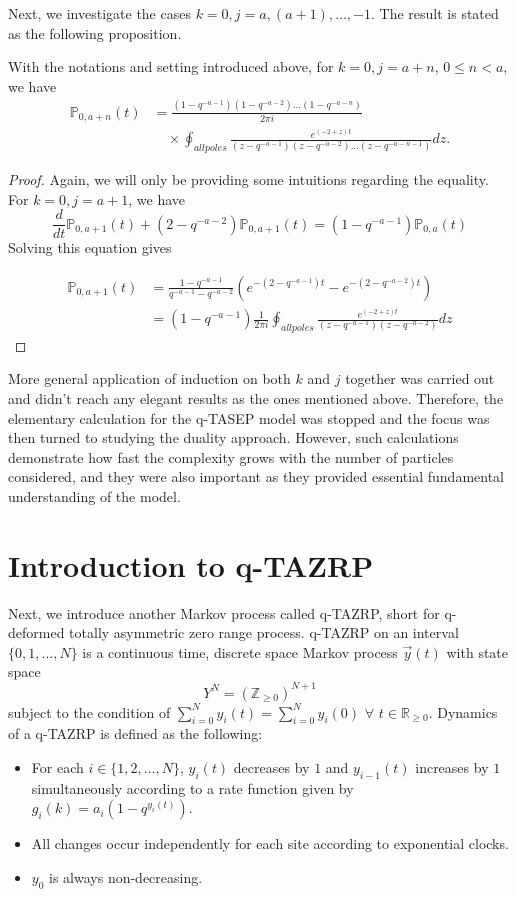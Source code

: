 Next, we investigate the cases $k = 0, j = a, (a+1), \dots, -1$. The result is stated as the following proposition.
\begin{proposition}
With the notations and setting introduced above, for $k = 0, j = a+n$, $0 \le n < a$, we have \\
\begin{align*}
\mathbb{P}_{0,a+n} (t) &= \frac{(1-q^{-a-1})(1-q^{-a-2})...(1-q^{-a-n})}{2 \pi i} \\
& \quad \times \oint_{all poles} \frac{e^{(-2+z)t}}{(z-q^{-a-1})(z-q^{-a-2})...(z-q^{-a-n-1})} dz.
\end{align*}
\end{proposition}

\begin{proof}
Again, we will only be providing some intuitions regarding the equality. \\
For $k=0, j=a+1$, we have $$\frac{d}{dt} \mathbb{P}_{0,a+1}(t) + (2-q^{-a-2}) \mathbb{P}_{0,a+1}(t) = (1-q^{-a-1}) \mathbb{P}_{0,a}(t)$$
 Solving this equation gives 

 \begin{align*}
 \mathbb{P}_{0,a+1} (t) &= \frac{1-q^{-a-1}}{q^{-a-1} - q^{-a-2}} (e^{-(2-q^{-a-1})t} - e^{-(2-q^{-a-2})t})\\
 &= (1-q^{-a-1}) \frac{1}{2 \pi i} \oint_{all poles} \frac{e^{(-2+z)t}}{(z-q^{-a-1})(z-q^{-a-2})} dz
 \end{align*}
\end{proof}

More general application of induction on both $k$ and $j$ together was carried out and didn't reach any elegant results as the ones mentioned above. Therefore, the elementary calculation for the q-TASEP model was stopped and the focus was then turned to studying the duality approach. However, such calculations demonstrate how fast the complexity grows with the number of particles considered, and they were also important as they provided essential fundamental understanding of the model. 

\section{Introduction to q-TAZRP}
Next, we introduce another Markov process called q-TAZRP, short for q-deformed totally asymmetric zero range process. q-TAZRP on an interval $\{0,1,...,N\}$ is a continuous time, discrete space Markov process $\vec{y}(t)$ with state space $$Y^N = (\mathbb{Z}_{\ge 0})^{N+1}$$ subject to the condition of $\sum_{i=0}^{N} y_i(t) = \sum_{i=0}^{N} y_i(0)$ $\forall$ $t\in\mathbb{R}_{\ge 0}$. Dynamics of a q-TAZRP is defined as the following:
\begin{itemize}
\item For each $i \in \{1,2,\dots,N\}$, $y_i(t)$ decreases by $1$ and $y_{i-1}(t)$ increases by $1$ simultaneously according to a rate function given by $g_i(k) = a_i (1-q^{y_i(t)})$.
\item All changes occur independently for each site according to exponential clocks.
\item $y_0$ is always non-decreasing.
\end{itemize}

